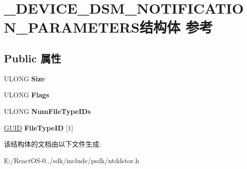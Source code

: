 \hypertarget{struct___d_e_v_i_c_e___d_s_m___n_o_t_i_f_i_c_a_t_i_o_n___p_a_r_a_m_e_t_e_r_s}{}\section{\+\_\+\+D\+E\+V\+I\+C\+E\+\_\+\+D\+S\+M\+\_\+\+N\+O\+T\+I\+F\+I\+C\+A\+T\+I\+O\+N\+\_\+\+P\+A\+R\+A\+M\+E\+T\+E\+R\+S结构体 参考}
\label{struct___d_e_v_i_c_e___d_s_m___n_o_t_i_f_i_c_a_t_i_o_n___p_a_r_a_m_e_t_e_r_s}
\subsection*{Public 属性}
\begin{DoxyCompactItemize}
\item 
\mbox{\label{struct___d_e_v_i_c_e___d_s_m___n_o_t_i_f_i_c_a_t_i_o_n___p_a_r_a_m_e_t_e_r_s_a6b3b24dbf084b04cc9c7b0305d9167f4}} 
U\+L\+O\+NG {\bfseries Size}
\item 
\mbox{\label{struct___d_e_v_i_c_e___d_s_m___n_o_t_i_f_i_c_a_t_i_o_n___p_a_r_a_m_e_t_e_r_s_a97a8e5c1af3904c4268d8d4708181d94}} 
U\+L\+O\+NG {\bfseries Flags}
\item 
\mbox{\label{struct___d_e_v_i_c_e___d_s_m___n_o_t_i_f_i_c_a_t_i_o_n___p_a_r_a_m_e_t_e_r_s_a3363e8885950b98145bbe94f08e0b88e}} 
U\+L\+O\+NG {\bfseries Num\+File\+Type\+I\+Ds}
\item 
\mbox{\label{struct___d_e_v_i_c_e___d_s_m___n_o_t_i_f_i_c_a_t_i_o_n___p_a_r_a_m_e_t_e_r_s_a6ac4bb8ee843ebb1dfbf77736cd20afd}} 
\hyperlink{interface_g_u_i_d}{G\+U\+ID} {\bfseries File\+Type\+ID} \mbox{[}1\mbox{]}
\end{DoxyCompactItemize}


该结构体的文档由以下文件生成\+:\begin{DoxyCompactItemize}
\item 
E\+:/\+React\+O\+S-\/0../sdk/include/psdk/ntddstor.\+h\end{DoxyCompactItemize}
